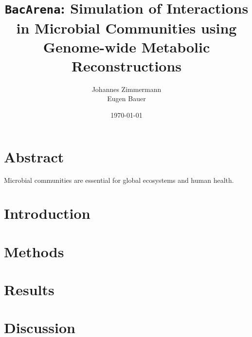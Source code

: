 \documentclass{scrartcl}
\title{\texttt{BacArena}: Simulation of Interactions in Microbial Communities using Genome-wide Metabolic Reconstructions}
\author{Johannes Zimmermann\\Eugen Bauer}
\date{\today}
\begin{document}
\maketitle

\section*{Abstract}
Microbial communities are essential for global ecosystems and human health.

\newpage

\tableofcontents

\newpage

\section{Introduction}


\section{Methods}


\section{Results}


\section{Discussion}



\printbibliography 
\end{document}
